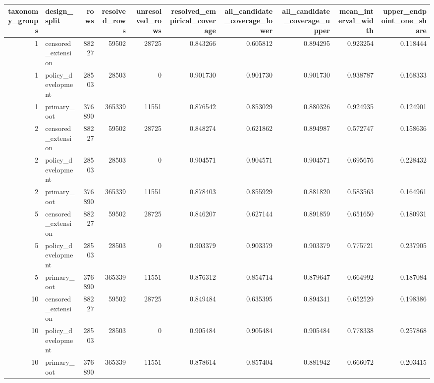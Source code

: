 \begin{tabular}{rlrrrrrrrr}
\toprule
taxonomy\_groups & design\_split & rows & resolved\_rows & unresolved\_rows & resolved\_empirical\_coverage & all\_candidate\_coverage\_lower & all\_candidate\_coverage\_upper & mean\_interval\_width & upper\_endpoint\_one\_share \\
\midrule
1 & censored\_extension & 88227 & 59502 & 28725 & 0.843266 & 0.605812 & 0.894295 & 0.923254 & 0.118444 \\
1 & policy\_development & 28503 & 28503 & 0 & 0.901730 & 0.901730 & 0.901730 & 0.938787 & 0.168333 \\
1 & primary\_oot & 376890 & 365339 & 11551 & 0.876542 & 0.853029 & 0.880326 & 0.924935 & 0.124901 \\
2 & censored\_extension & 88227 & 59502 & 28725 & 0.848274 & 0.621862 & 0.894987 & 0.572747 & 0.158636 \\
2 & policy\_development & 28503 & 28503 & 0 & 0.904571 & 0.904571 & 0.904571 & 0.695676 & 0.228432 \\
2 & primary\_oot & 376890 & 365339 & 11551 & 0.878403 & 0.855929 & 0.881820 & 0.583563 & 0.164961 \\
5 & censored\_extension & 88227 & 59502 & 28725 & 0.846207 & 0.627144 & 0.891859 & 0.651650 & 0.180931 \\
5 & policy\_development & 28503 & 28503 & 0 & 0.903379 & 0.903379 & 0.903379 & 0.775721 & 0.237905 \\
5 & primary\_oot & 376890 & 365339 & 11551 & 0.876312 & 0.854714 & 0.879647 & 0.664992 & 0.187084 \\
10 & censored\_extension & 88227 & 59502 & 28725 & 0.849484 & 0.635395 & 0.894341 & 0.652529 & 0.198386 \\
10 & policy\_development & 28503 & 28503 & 0 & 0.905484 & 0.905484 & 0.905484 & 0.778338 & 0.257868 \\
10 & primary\_oot & 376890 & 365339 & 11551 & 0.878614 & 0.857404 & 0.881942 & 0.666072 & 0.203415 \\
\bottomrule
\end{tabular}
